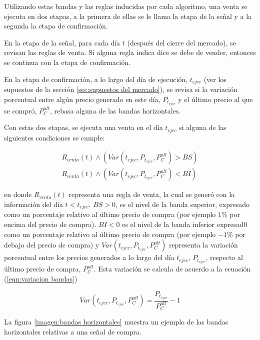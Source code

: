 \documentclass[12pt]{report}
\theoremstyle{break}
\theoremstyle{break}
\begin{document}
Utilizando estas bandas y las reglas inducidas por cada algoritmo, una venta se ejecuta en dos etapas, a la primera de ellas se le llama la etapa de la señal y a la segunda la etapa de confirmación.

En la etapa de la señal, para cada día $t$ (después del cierre del mercado), se revisan las reglas de venta. Si alguna regla indica dice se debe de vender, entonces se continua con la etapa de confirmación.

En la etapa de confirmación, a lo largo del día de ejecución, $t_{ejec}$ (ver los supuestos de la sección \ref{sec:supuestos del mercado}), se revisa si la variación porcentual entre algún precio generado en este día, $P_{t_{ejec}}$ y el último precio al que se compró, $P_{C}^{ult}$, rebasa alguna de las bandas horizontales.

Con estas dos etapas, se ejecuta una venta en el día $t_{ejec}$ si alguna de las siguientes condiciones se cumple:

\begin{align}
R_{venta}(t) \wedge (Var(t_{ejec}, P_{t_{ejec}}, P_{C}^{ult} ) > BS) \label{eqn:Venta limite sup}\\
R_{venta}(t) \wedge (Var(t_{ejec}, P_{t_{ejec}}, P_{C}^{ult} ) < BI) \label{eqn:Venta limite inf}
\end{align}

en donde $R_{venta}(t)$ representa una regla de venta, la cual se generó con la información del día $t < t_{ejec}$. $BS>0$, es el nivel de la banda superior, expresado como un porcentaje relativo al último precio de compra (por ejemplo $1\%$ por encima del precio de compra). $BI<0$ es el nivel de la banda inferior expresad0 como un porcentaje relativo al último precio de compra (por ejemplo $-1\%$ por debajo del precio de compra) y $Var(t_{ejec}, P_{t_{ejec}}, P_{C}^{ult} )$ representa la variación porcentual entre los precios generados a lo largo del día $t_{ejec}$, $P_{t_{ejec}}$, respecto al último precio de compra, $P_{C}^{ult}$. Esta variación se calcula de acuerdo a la ecuación (\ref{eqn:variacion bandas})

\begin{equation} \label{eqn:variacion bandas}
Var(t_{ejec}, P_{t_{ejec}}, P_{C}^{ult} ) = \dfrac{P_{t_{ejec}}} {P_{C}^{ult}} - 1
\end{equation}

La figura \ref{imagen:bandas horizontales} muestra un ejemplo de las bandas horizontales relativas a una señal de compra.
\end{document}
